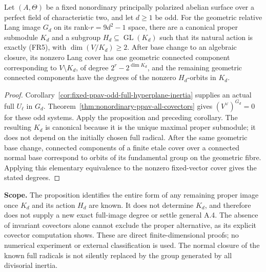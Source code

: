 \begin{corollary}
\label{cor:root-odd-image-parabolic-alternative}
Let \((A,\Theta)\) be a fixed nonordinary principally polarized
abelian surface over a perfect field of characteristic two, and
let \(d\geq1\) be odd. For the geometric relative Lang image
\(G_d\) on its rank-\(r=9d^2-1\) space, there are a canonical
proper submodule \(K_d\) and a subgroup
\(H_d\subseteq\operatorname{GL}(K_d)\) such that its natural
action is exactly (FR5), with \(\dim(V/K_d)\geq2\).
After base change to an algebraic closure, its nonzero Lang cover
has one geometric connected component corresponding to
\(V\setminus K_d\), of degree \(2^r-2^{\dim K_d}\), and
the remaining geometric connected components have the degrees of the nonzero
\(H_d\)-orbits in \(K_d\).
\end{corollary}
\begin{proof}
Corollary~\ref{cor:fixed-ppav-odd-full-hyperplane-inertia}
supplies an actual full \(U_\ell\) in \(G_d\).
Theorem~\ref{thm:nonordinary-ppav-all-covectors} gives
\((V^\vee)^{G_d}=0\) for these odd systems. Apply the
proposition and preceding corollary. The resulting \(K_d\)
is canonical because it is the unique maximal proper
submodule; it does not depend on the initially chosen full
radical. After the same geometric base change, connected components of a
finite etale cover over a connected normal base correspond to orbits of its
fundamental group on the geometric fibre. Applying this
elementary equivalence to the nonzero fixed-vector cover
gives the stated degrees.
\end{proof}

\par\smallskip\noindent\textbf{Scope.}
The proposition identifies the entire form of any remaining
proper image once \(K_d\) and its action \(H_d\) are known.
It does not determine \(K_d\), and therefore does not supply
a new exact full-image degree or settle general A.4.
The absence of invariant covectors alone cannot exclude the
proper alternative, as its explicit covector computation shows.
These are direct finite-dimensional proofs; no numerical
experiment or external classification is used. The normal
closure of the known full radicals is not silently replaced
by the group generated by all divisorial inertia.
